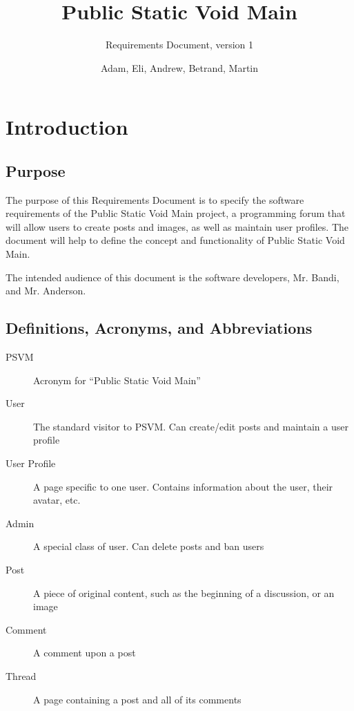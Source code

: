 \documentclass[12pt]{scrartcl}
\begin{document}
\title{Public Static Void Main}
\subtitle{Requirements Document, version 1}
\author{Adam, Eli, Andrew, Betrand, Martin}

\maketitle

\newpage\null\thispagestyle{empty}\newpage

\tableofcontents

\newpage\null\thispagestyle{empty}\newpage

\section{Introduction}
\subsection{Purpose}
The purpose of this Requirements Document is to specify the software requirements of the Public Static Void Main project, a programming forum that will allow users to create posts and images, as well as maintain user profiles. The document will help to define the concept and functionality of Public Static Void Main.
 
The intended audience of this document is the software developers, Mr. Bandi, and Mr. Anderson.
 
\subsection{Definitions, Acronyms, and Abbreviations}
\begin{description}
\item [PSVM]          	Acronym for “Public Static Void Main”
\item [User]            The standard visitor to PSVM. Can create/edit posts and maintain a user profile
\item [User Profile] 	A page specific to one user. Contains information about the user, their avatar, etc.
\item [Admin]         	A special class of user. Can delete posts and ban users
\item [Post]            A piece of original content, such as the beginning of a discussion, or an image
\item [Comment]			A comment upon a post
\item [Thread]			A page containing a post and all of its comments
\end{description}
\end{document}
